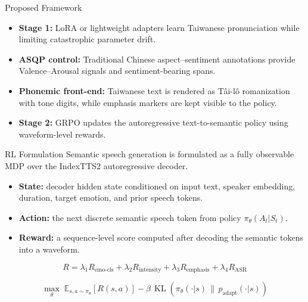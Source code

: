 \documentclass[final,20pt]{beamer}
\newlength{\colwidth}
\begin{document}
\begin{frame}[t]
\begin{columns}[t]
\begin{column}{\colwidth}
\begin{block}{Proposed Framework}
    

    \begin{itemize}
      \item \textbf{Stage 1:} LoRA or lightweight adapters learn Taiwanese
      pronunciation while limiting catastrophic parameter drift.
      \item \textbf{ASQP control:} Traditional Chinese aspect--sentiment
      annotations provide Valence--Arousal signals and sentiment-bearing spans.
      \item \textbf{Phonemic front-end:} Taiwanese text is rendered as
      T\^ai-l\^o romanization with tone digits, while emphasis markers are kept
      visible to the policy.
      \item \textbf{Stage 2:} GRPO updates the autoregressive text-to-semantic
      policy using waveform-level rewards.
    \end{itemize}
  \end{block}

  \begin{block}{RL Formulation}
    Semantic speech generation is formulated as a fully observable MDP over the
    IndexTTS2 autoregressive decoder.

    \begin{itemize}
      \item \textbf{State:} decoder hidden state conditioned on input text,
      speaker embedding, duration, target emotion, and prior speech tokens.
      \item \textbf{Action:} the next discrete semantic speech token from
      policy $\pi_\theta(A_t|S_t)$.
      \item \textbf{Reward:} a sequence-level score computed after decoding the
      semantic tokens into a waveform.
    \end{itemize}

    \[
      R = \lambda_1 R_{\mathrm{emo\text{-}cls}}
        + \lambda_2 R_{\mathrm{intensity}}
        + \lambda_3 R_{\mathrm{emphasis}}
        + \lambda_4 R_{\mathrm{ASR}}
    \]

    \[
      \max_\theta\; \mathbb{E}_{s,a\sim\pi_\theta}\!\left[R(s,a)\right]
      - \beta\,\operatorname{KL}\!\left(\pi_\theta(\cdot|s)\,\|\,p_{\mathrm{adapt}}(\cdot|s)\right)
    \]
  \end{block}


\end{column}
\end{columns}
\end{frame}
\end{document}
